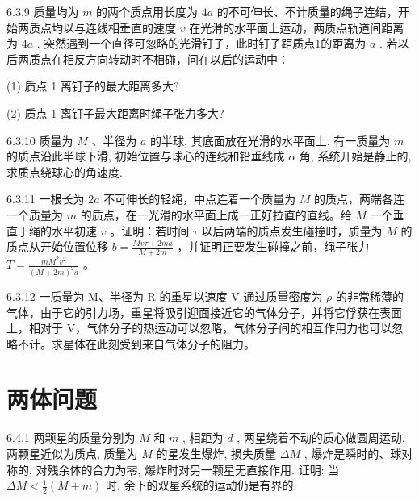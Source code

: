 \begin{problem}{6.3.9}
质量均为 $m$ 的两个质点用长度为 $4a$ 的不可伸长、不计质量的绳子连结，开始两质点均以与连线相垂直的速度 $v$ 在光滑的水平面上运动，两质点轨道间距离为 $4a$ . 突然遇到一个直径可忽略的光滑钉子，此时钉子距质点1的距离为 $a$ . 若以后两质点在相反方向转动时不相碰，问在以后的运动中：

(1) 质点 1 离钉子的最大距离多大?

(2) 质点 1 离钉子最大距离时绳子张力多大?
\end{problem}
\clearpage


\begin{problem}{6.3.10}
质量为 $M$ 、半径为 $a$ 的半球, 其底面放在光滑的水平面上. 有一质量为 $m$ 的质点沿此半球下滑, 初始位置与球心的连线和铅垂线成 $\alpha$ 角, 系统开始是静止的, 求质点绕球心的角速度.
\begin{center}

\end{center}
\end{problem}
\clearpage


\begin{problem}{6.3.11}
一根长为 $2a$ 不可伸长的轻绳，中点连着一个质量为 $M$ 的质点，两端各连一个质量为 $m$ 的质点，在一光滑的水平面上成一正好拉直的直线。给 $M$ 一个垂直于绳的水平初速 $v$ 。证明：若时间 $\tau$ 以后两端的质点发生碰撞时，质量为 $M$ 的质点从开始位置位移 $b = \frac{Mv\tau + 2ma}{M + 2m}$ ，并证明正要发生碰撞之前，绳子张力 $T = \frac{mM^2v^2}{(M + 2m)^2a}$ 。
\end{problem}
\clearpage


\begin{problem}{6.3.12}
一质量为 M、半径为 R 的重星以速度 V 通过质量密度为 $\rho$ 的非常稀薄的气体，由于它的引力场，重星将吸引迎面接近它的气体分子，并将它俘获在表面上，相对于 V，气体分子的热运动可以忽略，气体分子间的相互作用力也可以忽略不计。求星体在此刻受到来自气体分子的阻力。
\end{problem}
\clearpage


\section{两体问题}

\begin{problem}{6.4.1}
两颗星的质量分别为 $M$ 和 $m$ , 相距为 $d$ , 两星绕着不动的质心做圆周运动. 两颗星近似为质点, 质量为 $M$ 的星发生爆炸, 损失质量 $\Delta M$ , 爆炸是瞬时的、球对称的, 对残余体的合力为零, 爆炸时对另一颗星无直接作用. 证明: 当 $\Delta M < \frac{1}{2} (M + m)$ 时, 余下的双星系统的运动仍是有界的.
\end{problem}
\clearpage


